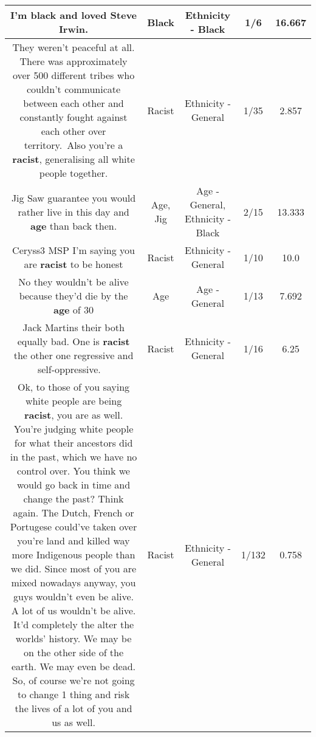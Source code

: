 \documentclass[11pt]{article}
\newlength\mylength
\begin{document}
\begin{center}
\begin{longtable}{|C{.65\mylength}|C{.30\mylength}|C{.12\mylength}|C{.12\mylength}|C{.12\mylength}|}
  \small I'm \textbf{black} and loved Steve Irwin.\normalsize   & Black & Ethnicity - Black & 1/6 & 16.667 \\  \hline
  \small They weren't peaceful at all. There was approximately over 500 different tribes who couldn't communicate between each other and constantly fought against each other over territory. Also you're a \textbf{racist}, generalising all white people together.\normalsize   & Racist & Ethnicity - General & 1/35 & 2.857 \\  \hline
  \small Jig Saw guarantee you would rather live in this day and \textbf{age} than back then.\normalsize   & Age, Jig & Age - General, Ethnicity - Black & 2/15 & 13.333 \\  \hline
  \small Ceryss3 MSP I'm saying you are \textbf{racist} to be honest\normalsize   & Racist & Ethnicity - General & 1/10 & 10.0 \\  \hline
  \small No they wouldn't be alive because they'd die by the \textbf{age} of 30\normalsize   & Age & Age - General & 1/13 & 7.692 \\  \hline
  \small Jack Martins their both equally bad. One is \textbf{racist} the other one regressive and self-oppressive. 🤦‍♂️\normalsize   & Racist & Ethnicity - General & 1/16 & 6.25 \\  \hline
  \small Ok, to those of you saying white people are being \textbf{racist}, you are as well. You're judging white people for what their ancestors did in the past, which we have no control over. You think we would go back in time and change the past? Think again. The Dutch, French or Portugese could've taken over you're land and killed way more Indigenous people than we did. Since most of you are mixed nowadays anyway, you guys wouldn't even be alive. A lot of us wouldn't be alive. It'd completely the alter the worlds' history. We may be on the other side of the earth. We may even be dead. So, of course we're not going to change 1 thing and risk the lives of a lot of you and us as well.\normalsize   & Racist & Ethnicity - General & 1/132 & 0.758 \\  \hline

\end{longtable}
\end{center}
\end{document}
